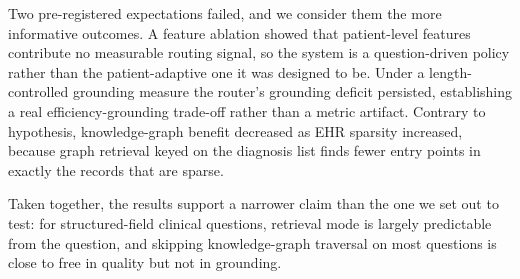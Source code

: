 \documentclass[preprint,12pt]{elsarticle}
\begin{document}
Two pre-registered expectations failed, and we consider them the more
informative outcomes. A feature ablation showed that patient-level
features contribute no measurable routing signal, so the system is a
question-driven policy rather than the patient-adaptive one it was
designed to be. Under a length-controlled grounding measure the
router's grounding deficit persisted, establishing a real
efficiency-grounding trade-off rather than a metric artifact. Contrary
to hypothesis, knowledge-graph benefit decreased as EHR sparsity
increased, because graph retrieval keyed on the diagnosis list finds
fewer entry points in exactly the records that are sparse.

Taken together, the results support a narrower claim than the one we
set out to test: for structured-field clinical questions, retrieval
mode is largely predictable from the question, and skipping
knowledge-graph traversal on most questions is close to free in
quality but not in grounding.
\end{document}
